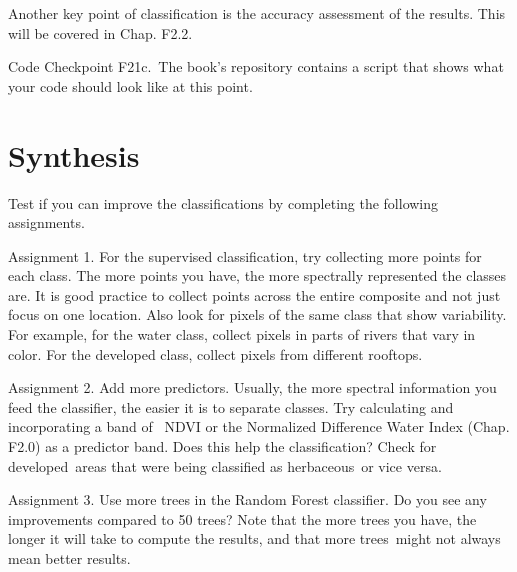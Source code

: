 \documentclass[
  letterpaper,
  DIV=11,
  numbers=noendperiod]{scrreprt}
\begin{document}
Another key point of classification is the accuracy assessment of the
results. This will be covered in Chap. F2.2.

\begin{tcolorbox}[enhanced jigsaw, left=2mm, breakable, rightrule=.15mm, opacityback=0, colframe=quarto-callout-note-color-frame, colbacktitle=quarto-callout-note-color!10!white, arc=.35mm, opacitybacktitle=0.6, toptitle=1mm, colback=white, leftrule=.75mm, title=\textcolor{quarto-callout-note-color}{\faInfo}\hspace{0.5em}{Note}, toprule=.15mm, bottomtitle=1mm, titlerule=0mm, bottomrule=.15mm, coltitle=black]

Code Checkpoint F21c.~The book's repository contains a script that shows
what your code should look like at this point.

\end{tcolorbox}

\hypertarget{synthesis-1}{%
\section*{Synthesis}\label{synthesis-1}}


Test if you can improve the classifications by completing the following
assignments.

Assignment 1. For the supervised classification, try collecting more
points for each class. The more points you have, the more spectrally
represented the classes are. It is good practice to collect points
across the entire composite and not just focus on one location. Also
look for pixels of the same class that show variability. For example,
for the water class, collect pixels in parts of rivers that vary in
color. For the developed class, collect pixels from different rooftops.

Assignment 2. Add more predictors. Usually, the more spectral
information you feed the classifier, the easier it is to separate
classes. Try calculating and incorporating a band of ~NDVI or the
Normalized Difference Water Index (Chap. F2.0) as a predictor band. Does
this help the classification? Check for developed~areas that were being
classified as herbaceous~or vice versa.

Assignment 3. Use more trees in the Random Forest classifier. Do you see
any improvements compared to 50 trees? Note that the more trees you
have, the longer it will take to compute the results, and that more
trees~might not always mean better results.
\end{document}
